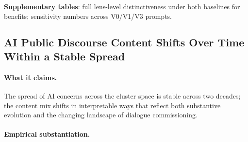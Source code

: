 \documentclass[11pt, a4paper]{article}
\begin{document}
\noindent\textbf{Supplementary tables}: full lens-level distinctiveness
under both baselines for benefits; sensitivity numbers across
V0/V1/V3 prompts.

\subsection{AI Public Discourse Content Shifts Over Time Within a Stable
Spread}

\paragraph{What it claims.}  The spread of AI concerns across the cluster
space is stable across two decades; the content mix shifts in
interpretable ways that reflect both substantive evolution and the
changing landscape of dialogue commissioning.

\paragraph{Empirical substantiation.}
\end{document}
